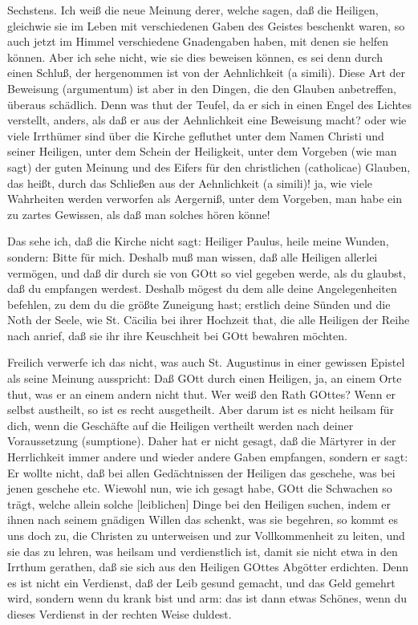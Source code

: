 Sechstens. Ich weiß die neue Meinung derer, welche sagen, daß die Heiligen, gleichwie sie im Leben mit verschiedenen Gaben des Geistes beschenkt waren, so auch jetzt im Himmel verschiedene Gnadengaben haben, mit denen sie helfen können. Aber ich sehe nicht, wie sie dies beweisen können, es sei denn durch einen Schluß, der hergenommen ist von der Aehnlichkeit (a simili). Diese Art der Beweisung (argumentum) ist aber in den Dingen, die den Glauben anbetreffen, überaus schädlich. Denn was thut der Teufel, da er sich in einen Engel des Lichtes verstellt, anders, als daß er aus der Aehnlichkeit eine Beweisung macht? oder wie viele Irrthümer sind über die Kirche gefluthet unter dem Namen Christi und seiner Heiligen, unter dem Schein der Heiligkeit, unter dem Vorgeben (wie man sagt) der guten Meinung und des Eifers für den christlichen (catholicae) Glauben, das heißt, durch das Schließen aus der Aehnlichkeit (a simili)! ja, wie viele Wahrheiten werden verworfen als Aergerniß, unter dem Vorgeben, man habe ein zu zartes Gewissen, als daß man solches hören könne!

Das sehe ich, daß die Kirche nicht sagt: Heiliger Paulus, heile meine Wunden, sondern: Bitte für mich. Deshalb muß man wissen, daß alle Heiligen allerlei vermögen, und daß dir durch sie von GOtt so viel gegeben werde, als du glaubst, daß du empfangen werdest. Deshalb mögest du dem alle deine Angelegenheiten befehlen, zu dem du die größte Zuneigung hast; erstlich deine Sünden und die Noth der Seele, wie St. Cäcilia bei ihrer Hochzeit that, die alle Heiligen der Reihe nach anrief, daß sie ihr ihre Keuschheit bei GOtt bewahren möchten.

Freilich verwerfe ich das nicht, was auch St. Augustinus in einer gewissen Epistel als seine Meinung ausspricht: Daß GOtt durch einen Heiligen, ja, an einem Orte thut, was er an einem andern nicht thut. Wer weiß den Rath GOttes? Wenn er selbst austheilt, so ist es recht ausgetheilt. Aber darum ist es nicht heilsam für dich, wenn die Geschäfte auf die Heiligen vertheilt werden nach deiner Voraussetzung (sumptione). Daher hat er nicht gesagt, daß die Märtyrer in der Herrlichkeit immer andere und wieder andere Gaben empfangen, sondern er sagt: Er wollte nicht, daß bei allen Gedächtnissen der Heiligen das geschehe, was bei jenen geschehe etc. Wiewohl nun, wie ich gesagt habe, GOtt die Schwachen so trägt, welche allein solche [leiblichen] Dinge bei den Heiligen suchen, indem er ihnen nach seinem gnädigen Willen das schenkt, was sie begehren, so kommt es uns doch zu, die Christen zu unterweisen und zur Vollkommenheit zu leiten, und sie das zu lehren, was heilsam und verdienstlich ist, damit sie nicht etwa in den Irrthum gerathen, daß sie sich aus den Heiligen GOttes Abgötter erdichten. Denn es ist nicht ein Verdienst, daß der Leib gesund gemacht, und das Geld gemehrt wird, sondern wenn du krank bist und arm: das ist dann etwas Schönes, wenn du dieses Verdienst in der rechten Weise duldest.

